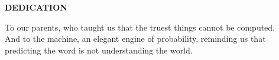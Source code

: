 
\begin{dedication}

    \begin{center}\textbf{DEDICATION}\end{center}\vspace{1cm}

    To our parents, who taught us that the truest things cannot be computed.\\[1.5em]
    And to the machine, an elegant engine of probability, reminding us that predicting the word is not understanding the world.

\end{dedication}

